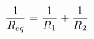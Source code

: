 \documentclass[preview]{standalone}
\begin{document}
\begin{align*}
\special{dvisvgm:raw <g id='unique000'>}\frac{1}{R_{eq}} = \frac{1}{R_1} + \frac{1}{R_2}\special{dvisvgm:raw </g>}
\end{align*}
\end{document}
